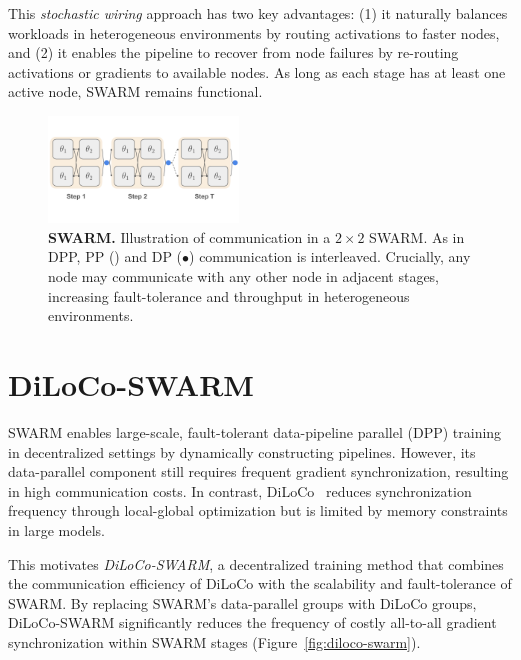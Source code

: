 \documentclass{article}
\newcommand{\orangebox}{\colorbox{oorange!50}{\hspace{0.3em}}}
\newcommand{\bluecircle}{\textcolor{bblue}{\LARGE$\bullet$}}
\begin{document}
This \textit{stochastic wiring} approach has two key advantages: (1) it naturally balances workloads in heterogeneous environments by routing activations to faster nodes, and (2) it enables the pipeline to recover from node failures by re-routing activations or gradients to available nodes. As long as each stage has at least one active node, SWARM remains functional.


\begin{figure}[ht]
    \centering
    \includegraphics[width=0.45\textwidth]{figures/swarm.pdf}
    \caption{\textbf{SWARM.} Illustration of communication in a $2 \times 2$ SWARM. As in DPP, PP (\orangebox) and DP (\bluecircle) communication is interleaved. Crucially, any node may communicate with any other node in adjacent stages, increasing fault-tolerance and throughput in heterogeneous environments.}
    \label{fig:swarm}
\end{figure}

\section{DiLoCo-SWARM}

SWARM enables large-scale, fault-tolerant data-pipeline parallel (DPP) training in decentralized settings by dynamically constructing pipelines. However, its data-parallel component still requires frequent gradient synchronization, resulting in high communication costs. In contrast, DiLoCo~\cite{douillard2023diloco} reduces synchronization frequency through local-global optimization but is limited by memory constraints in large models.

This motivates \textit{DiLoCo-SWARM}, a decentralized training method that combines the communication efficiency of DiLoCo with the scalability and fault-tolerance of SWARM. By replacing SWARM's data-parallel groups with DiLoCo groups, DiLoCo-SWARM significantly reduces the frequency of costly
all-to-all gradient synchronization within SWARM stages (Figure~\ref{fig:diloco-swarm}).
\end{document}
